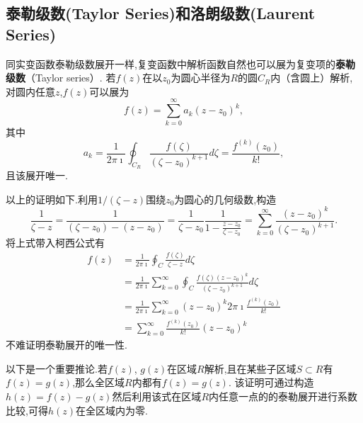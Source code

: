 \subsection{泰勒级数(Taylor Series)和洛朗级数(Laurent Series)}
\label{subsec:taylor_laurent_series}
同实变函数泰勒级数展开一样,复变函数中解析函数自然也可以展为复变项的\textbf{泰勒级数}（Taylor series）.
若$f(z)$在以$z_0$为圆心半径为$R$的圆$C_R$内（含圆上）解析,对圆内任意$z$,$f(z)$可以展为
\begin{equation}
    f(z) = \sum_{k=0}^{\infty} a_k (z-z_0)^k,
\end{equation}
其中
\begin{equation}
    a_k=\frac{1}{2 \pi \imath} \oint_{C_{R}} \frac{f(\zeta)}{\left(\zeta-z_0\right)^{k+1}} d \zeta
    =\frac{f^{(k)}\left(z_0\right)}{k !} ,
\end{equation}
且该展开唯一.

以上的证明如下.利用$1/(\zeta -z)$围绕$z_0$为圆心的几何级数,构造
\[
\frac{1}{\zeta -z} = \frac{1}{(\zeta -z_0) - (z - z_0)} = \frac{1}{\zeta - z_0}\frac{1}{ 1 - \frac{z-z_0}{\zeta - z_0}}
 = \sum_{k=0}^{\infty}\frac{(z-z_0)^k}{(\zeta - z_0)^{k+1}}.    
\]
将上式带入柯西公式有
\begin{equation}
    \begin{aligned}
        f(z) &= \frac{1}{2\pi \imath} \oint_C \frac{f(\zeta)}{\zeta - z} d \zeta
        \\
        &= \frac{1}{2\pi \imath} \sum_{k=0} ^{\infty} \oint_C \frac{f(\zeta)(z-z_0)^k}{(\zeta - z_0)^{k+1}} d \zeta
        \\
        &= \frac{1}{2\pi \imath} \sum_{k=0} ^{\infty}(z-z_0)^k 2\pi \imath \frac{f^{(k)}(z_0)}{k!}
        \\
        & = \sum_{k=0} ^{\infty}  \frac{f^{(k)}(z_0)}{k!} (z-z_0)^k
    \end{aligned}
\end{equation}
不难证明泰勒展开的唯一性.

以下是一个重要推论.若$f(z)$, $g(z)$在区域$R$解析,且在某些子区域$S\subset R$有$f(z)=g(z)$,那么全区域$R$内都有$f(z)=g(z)$.
该证明可通过构造$h(z) = f(z) - g(z)$然后利用该式在区域$R$内任意一点的的泰勒展开进行系数比较,可得$h(z)$在全区域内为零.

